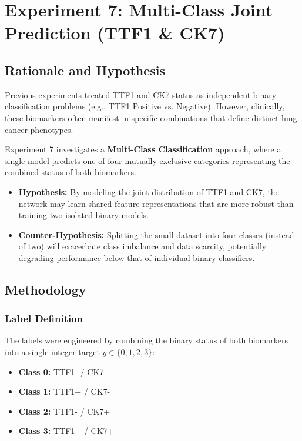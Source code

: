 \section{Experiment 7: Multi-Class Joint Prediction (TTF1 \& CK7)}

\subsection{Rationale and Hypothesis}
Previous experiments treated TTF1 and CK7 status as independent binary classification problems (e.g., TTF1 Positive vs. Negative). However, clinically, these biomarkers often manifest in specific combinations that define distinct lung cancer phenotypes.

Experiment 7 investigates a \textbf{Multi-Class Classification} approach, where a single model predicts one of four mutually exclusive categories representing the combined status of both biomarkers.

\begin{itemize}
    \item \textbf{Hypothesis:} By modeling the joint distribution of TTF1 and CK7, the network may learn shared feature representations that are more robust than training two isolated binary models.
    \item \textbf{Counter-Hypothesis:} Splitting the small dataset into four classes (instead of two) will exacerbate class imbalance and data scarcity, potentially degrading performance below that of individual binary classifiers.
\end{itemize}

\subsection{Methodology}

\subsubsection{Label Definition}
The labels were engineered by combining the binary status of both biomarkers into a single integer target $y \in \{0, 1, 2, 3\}$:
\begin{itemize}
    \item \textbf{Class 0:} TTF1- / CK7-
    \item \textbf{Class 1:} TTF1+ / CK7-
    \item \textbf{Class 2:} TTF1- / CK7+
    \item \textbf{Class 3:} TTF1+ / CK7+
\end{itemize}

